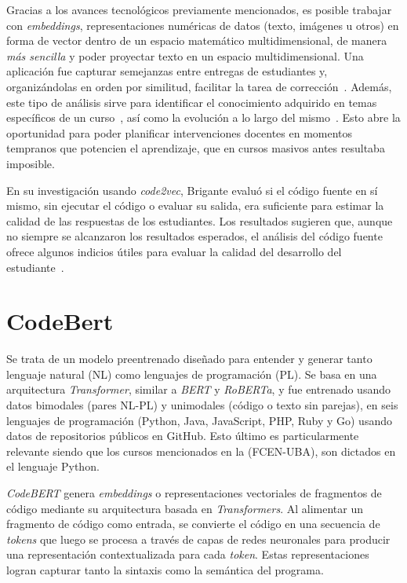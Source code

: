 \documentclass[11pt,a4paper,twoside,openany]{tesis}
\begin{document}
Gracias a los avances tecnológicos previamente mencionados, es posible trabajar con \emph{embeddings}, representaciones numéricas de datos (texto, imágenes u otros) en forma de vector dentro de un espacio matemático multidimensional, de manera \emph{más sencilla} y poder proyectar texto en un espacio multidimensional. Una aplicación fue capturar semejanzas entre entregas de estudiantes y, organizándolas en orden por similitud, facilitar la tarea de corrección~\cite{simgrade}. Además, este tipo de análisis sirve para identificar el conocimiento adquirido en temas específicos de un curso~\cite{brigante2020evaluation}, así como la evolución a lo largo del mismo~\cite{wu2018zeroshotlearningcode}. Esto abre la oportunidad para poder planificar intervenciones docentes en momentos tempranos que potencien el aprendizaje, que en cursos masivos antes resultaba imposible. 

En su investigación usando \emph{code2vec},  Brigante  evaluó si el código fuente en sí mismo, sin ejecutar el código o evaluar su salida, era suficiente para estimar la calidad de las respuestas de los estudiantes. Los resultados sugieren que, aunque no siempre se alcanzaron los resultados esperados, el análisis del código fuente ofrece algunos indicios útiles para evaluar la calidad del desarrollo del estudiante~\cite{brigante2020evaluation}.


\section{CodeBert}

Se trata de un modelo preentrenado diseñado para entender y generar tanto lenguaje natural (NL) como lenguajes de programación (PL). Se basa en una arquitectura \emph{Transformer}, similar a \emph{BERT} y \emph{RoBERTa}, y fue entrenado usando datos bimodales (pares NL-PL) y unimodales (código o texto sin parejas), en seis lenguajes de programación (Python, Java, JavaScript, PHP, Ruby y Go) usando datos de repositorios públicos en GitHub. Esto último es particularmente relevante siendo que los cursos mencionados en la (FCEN-UBA), son dictados en el lenguaje Python.

\emph{CodeBERT} genera  \emph{embeddings} o representaciones vectoriales de fragmentos de código mediante su arquitectura basada en \emph{Transformers}. Al alimentar un fragmento de código como entrada, se convierte el código en una secuencia de \emph{tokens} que luego se procesa a través de capas de redes neuronales para producir una representación contextualizada para cada \emph{token}. Estas representaciones logran capturar tanto la sintaxis como la semántica del programa.
\end{document}
